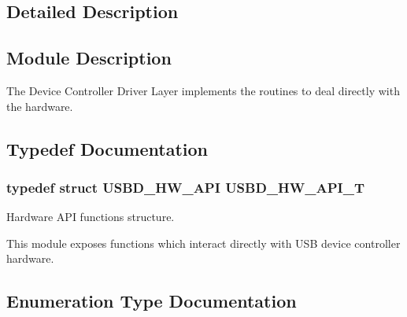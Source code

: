 \subsection{Detailed Description}
\hypertarget{group__USBD__HW_Sec_HWModDescription}{}\subsection{Module Description}\label{group__USBD__HW_Sec_HWModDescription}
The Device Controller Driver Layer implements the routines to deal directly with the hardware. 

\subsection{Typedef Documentation}
\subsubsection[{\texorpdfstring{U\+S\+B\+D\+\_\+\+H\+W\+\_\+\+A\+P\+I\+\_\+T}{USBD_HW_API_T}}]{\setlength{\rightskip}{0pt plus 5cm}typedef struct {\bf U\+S\+B\+D\+\_\+\+H\+W\+\_\+\+A\+PI}  {\bf U\+S\+B\+D\+\_\+\+H\+W\+\_\+\+A\+P\+I\+\_\+T}}\hypertarget{group__USBD__HW_ga4df5b7beaddc4e9267c320d92b4434fc}{}\label{group__USBD__HW_ga4df5b7beaddc4e9267c320d92b4434fc}


Hardware A\+PI functions structure.

This module exposes functions which interact directly with U\+SB device controller hardware. 



\subsection{Enumeration Type Documentation}
